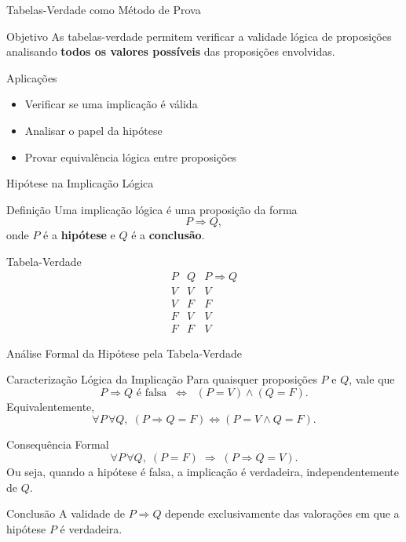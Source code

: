 \documentclass[9pt]{beamer}
\begin{document}
\begin{frame}{Tabelas-Verdade como Método de Prova}
\small

\begin{block}{Objetivo}
As tabelas-verdade permitem verificar a validade lógica
de proposições analisando \textbf{todos os valores possíveis}
das proposições envolvidas.
\end{block}

\begin{block}{Aplicações}
\begin{itemize}
    \item Verificar se uma implicação é válida
    \item Analisar o papel da hipótese
    \item Provar equivalência lógica entre proposições
\end{itemize}
\end{block}

\end{frame}
\begin{frame}{Hipótese na Implicação Lógica}
\small

\begin{block}{Definição}
Uma implicação lógica é uma proposição da forma
\[
P \Rightarrow Q,
\]
onde $P$ é a \textbf{hipótese} e $Q$ é a \textbf{conclusão}.
\end{block}

\begin{block}{Tabela-Verdade}
\[
\begin{array}{c|c|c}
P & Q & P \Rightarrow Q \\ \hline
V & V & V \\
V & F & F \\
F & V & V \\
F & F & V
\end{array}
\]
\end{block}

\end{frame}
\begin{frame}{Análise Formal da Hipótese pela Tabela-Verdade}
\small

\begin{block}{Caracterização Lógica da Implicação}
Para quaisquer proposições $P$ e $Q$, vale que
\[
P \Rightarrow Q \text{ é falsa}
\;\;\Longleftrightarrow\;\;
(P = V) \land (Q = F).
\]
Equivalentemente,
\[
\forall P\,\forall Q,\;
(P \Rightarrow Q = F)
\iff
(P = V \land Q = F).
\]
\end{block}

\begin{block}{Consequência Formal}
\[
\forall P\,\forall Q,\;
(P = F) \;\Rightarrow\; (P \Rightarrow Q = V).
\]
Ou seja, quando a hipótese é falsa,
a implicação é verdadeira, independentemente de $Q$.
\end{block}

\begin{block}{Conclusão}
A validade de $P \Rightarrow Q$ depende exclusivamente
das valorações em que a hipótese $P$ é verdadeira.
\end{block}

\end{frame}
\end{document}
